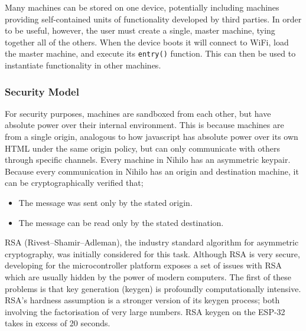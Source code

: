 \documentclass{article}
\begin{document}
Many machines can be stored on one device, potentially including machines providing self-contained units of functionality developed by third parties. In order to be useful, however, the user must create a single, master machine, tying together all of the others. When the device boots it will connect to WiFi, load the master machine, and execute its \texttt{entry()} function. This can then be used to instantiate functionality in other machines.

\subsubsection{Security Model}

For security purposes, machines are sandboxed from each other, but have absolute power over their internal environment. This is because machines are from a single origin, analogous to how javascript has absolute power over its own HTML under the same origin policy, but can only communicate with others through specific channels. Every machine in Nihilo has an asymmetric keypair. Because every communication in Nihilo has an origin and destination machine, it can be cryptographically verified that;
\begin{itemize}
\item The message was sent only by the stated origin.
\item The message can be read only by the stated destination.
\end{itemize}

RSA (Rivest–Shamir–Adleman)\cite{rsa}, the industry standard algorithm for asymmetric cryptography, was initially considered for this task. Although RSA is very secure, developing for the microcontroller platform exposes a set of issues with RSA which are usually hidden by the power of modern computers. The first of these problems is that key generation (keygen) is profoundly computationally intensive. RSA's hardness assumption is a stronger version of its keygen process; both involving the factorisation of very large numbers. RSA keygen on the ESP-32 takes in excess of 20 seconds.
\end{document}
